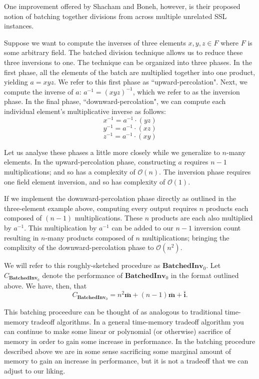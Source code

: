 One improvement offered by Shacham and Boneh, however, is their proposed notion of batching together divisions from across multiple unrelated SSL instances.

Suppose we want to compute the inverses of three elements $x, y, z \in F$ where $F$ is some arbitrary field. The batched division technique allows us to reduce these three inversions to one. The technique can be organized into three phases. In the first phase, all the elements of the batch are multiplied together into one product, yielding $a = xyz$. We refer to this first phase as ``upward-percolation". Next, we compute the inverse of $a$: $a^{-1} = (xyz)^{-1}$, which we refer to as the inversion phase. In the final phase, ``downward-percolation", we can compute each individual element's multiplicative inverse as follows:
$$
x^{-1} = a^{-1} \cdot (yz)
$$
$$
y^{-1} = a^{-1} \cdot (xz)
$$
$$
z^{-1} = a^{-1} \cdot (xy)
$$

Let us analyse these phases a little more closely while we generalize to $n$-many elements. In the upward-percolation phase, constructing $a$ requires $n-1$ multiplications; and so has a complexity of $\mathcal{O}(n)$. The inversion phase requires one field element inversion, and so has complexity of $\mathcal{O}(1)$.

If we implement the downward-percolation phase directly as outlined in the three-element example above, computing every output requires $n$ products each composed of $(n-1)$ multiplications. These $n$ products are each also multiplied by $a^{-1}$. This multiplication by $a^{-1}$ can be added to our $n-1$ inversion count resulting in $n$-many products composed of $n$ multiplications; bringing the complixity of the downward-percolation phase to $\mathcal{O}(n^2)$.

We will refer to this roughly-sketched procedure as $\textbf{BatchedInv}_0$. Let $C_{\textbf{BatchedInv}_0}$ denote the performance of $\textbf{BatchedInv}_0$ in the format outlined above. We have, then, that
$$
C_{\textbf{BatchedInv}_0} = n^2\bar{\textbf{m}} + (n-1)\bar{\textbf{m}} + \bar{\textbf{i}}.
$$

\noindent
This batching proceedure can be thought of as analogous to traditional time-memory tradeoff algorithms. In a general time-memory tradeoff algorithm you can continue to make some linear or polynomial (or otherwise) sacrifice of memory in order to gain some increase in performance. In the batching procedure described above we are in some sense sacrificing some marginal amount of memory to gain an increase in performance, but it is not a tradeoff that we can adjust to our liking.


